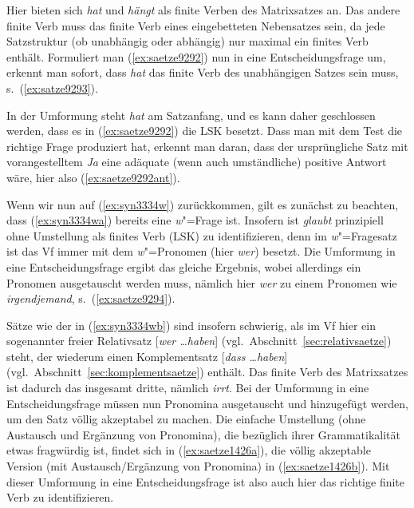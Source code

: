 Hier bieten sich \textit{hat} und \textit{hängt} als finite Verben des Matrixsatzes an.
Das andere finite Verb muss das finite Verb eines eingebetteten Nebensatzes sein, da jede Satzstruktur (ob unabhängig oder abhängig) nur maximal ein finites Verb enthält.
Formuliert man (\ref{ex:saetze9292}) nun in eine Entscheidungsfrage um, erkennt man sofort, dass \textit{hat} das finite Verb des unabhängigen Satzes sein muss, s.\ (\ref{ex:satze9293}).

\begin{exe}
\end{exe}

In der Umformung steht \textit{hat} am Satzanfang, und es kann daher geschlossen werden, dass es in (\ref{ex:saetze9292}) die LSK besetzt.
Dass man mit dem Test die richtige Frage produziert hat, erkennt man daran, dass der ursprüngliche Satz mit vorangestelltem \textit{Ja} eine adäquate (wenn auch umständliche) positive Antwort wäre, hier also (\ref{ex:saetze9292ant}).

\begin{exe}
\end{exe}

Wenn wir nun auf (\ref{ex:syn3334w}) zurückkommen, gilt es zunächst zu beachten, dass (\ref{ex:syn3334wa}) bereits eine \textit{w}"=Frage ist.
Insofern ist \textit{glaubt} prinzipiell ohne Umstellung als finites Verb (LSK) zu identifizieren, denn im \textit{w}"=Fragesatz ist das Vf immer mit dem \textit{w}"=Pro\-no\-men (hier \textit{wer}) besetzt.
Die Umformung in eine Entscheidungsfrage ergibt das gleiche Ergebnis, wobei allerdings ein Pronomen ausgetauscht werden muss, nämlich hier \textit{wer} zu einem Pronomen wie \textit{irgendjemand}, s.\ (\ref{ex:saetze9294}).

\begin{exe}
\end{exe}

Sätze wie der in (\ref{ex:syn3334wb}) sind insofern schwierig, als im Vf hier ein sogenannter freier Relativsatz [\textit{wer \ldots haben}] (vgl.\ Abschnitt~\ref{sec:relativsaetze}) steht, der wiederum einen Komplementsatz [\textit{dass \ldots haben}] (vgl.\ Abschnitt~\ref{sec:komplementsaetze}) enthält.
Das finite Verb des Matrixsatzes ist dadurch das insgesamt dritte, nämlich \textit{irrt}.
Bei der Umformung in eine Entscheidungsfrage müssen nun Pronomina ausgetauscht und hinzugefügt werden, um den Satz völlig akzeptabel zu machen.
Die einfache Umstellung (ohne Austausch und Ergänzung von Pronomina), die bezüglich ihrer Grammatikalität etwas fragwürdig ist, findet sich in (\ref{ex:saetze1426a}), die völlig akzeptable Version (mit Austausch\slash Ergänzung von Pronomina) in (\ref{ex:saetze1426b}).
Mit dieser Umformung in eine Entscheidungsfrage ist also auch hier das richtige finite Verb zu identifizieren.

